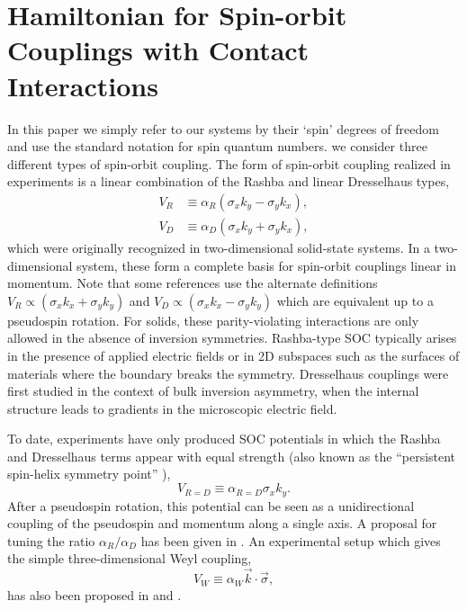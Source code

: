 \documentclass[%
 notitlepage,
 preprint,
showpacs,%
 amsmath,amssymb,
 aps,
pra,
]{revtex4-1}
\begin{document}
\section{\label{sec:Hamiltonian}Hamiltonian for Spin-orbit Couplings with Contact Interactions}

In this paper we simply refer to our systems by their `spin' degrees of freedom and use the standard notation for spin quantum numbers. we consider three different types of spin-orbit coupling. The form of spin-orbit coupling realized in experiments is a linear combination of the Rashba \cite{0022-3719-17-33-015} and linear Dresselhaus \cite{PhysRev.100.580} types,
\begin{align}
V_{R}&\equiv\alpha_R (\sigma_x k_y-\sigma_y k_x) \label{eq:Rashba},\\
V_{D}&\equiv\alpha_D (\sigma_x k_y+\sigma_y k_x) \label{eq:Dresselhaus},
\end{align} 
which were originally recognized in two-dimensional solid-state systems. In a two-dimensional system, these form a complete basis for spin-orbit couplings linear in momentum. Note that some references use the alternate definitions $V_R\propto  (\sigma_x k_x+\sigma_y k_y) $ and $V_D\propto  (\sigma_x k_x-\sigma_y k_y) $ which are equivalent up to a pseudospin rotation.  For solids, these parity-violating interactions are only allowed in the absence of inversion symmetries. Rashba-type SOC typically arises in the presence of applied electric fields or in 2D subspaces such as the surfaces of materials where the boundary breaks the symmetry. Dresselhaus couplings were first studied in the context of bulk inversion asymmetry, when the internal structure leads to gradients in the microscopic electric field. 

To date, experiments have only produced SOC potentials in which the Rashba and Dresselhaus terms appear with equal strength (also known as the ``persistent spin-helix symmetry point'' \cite{PhysRevLett.97.236601}), 
\begin{equation}
\label{eq:R=D}
V_{R=D}\equiv\alpha_{R=D}\sigma_x k_y.
\end{equation} 
After a pseudospin rotation, this potential can be seen as a unidirectional coupling of the pseudospin and momentum along a single axis. A proposal for tuning the ratio $\alpha_R/\alpha_D$ has been given in \cite{PhysRevA.84.025602}.  An experimental setup which gives the simple three-dimensional Weyl coupling,
\begin{equation}\label{eq:Weyl}
V_{W}\equiv\alpha_W \vec{k}\cdot\vec{\sigma},
\end{equation}
has also been proposed in \cite{PhysRevLett.108.235301} and \cite{PhysRevLett.111.125301}. 
\end{document}

